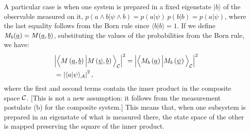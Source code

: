 \documentclass[aps,prl,amsmath,amssymb,twocolumn,nofootinbib]{revtex4}
\theoremstyle{plain}
\theoremstyle{definition}
\theoremstyle{remark}
\newcommand{\pj}[1] {\underbar{$#1$}}
\def\>{\rangle}
\def\<{\langle}
\def\labell#1{\label{#1}}
\begin{document}
	A particular case is when one system is
	prepared in a fixed eigenstate $|b\>$ of the observable measured on it,
	$p(a\wedge b|\psi\wedge b)=p(a|\psi)\:p(b|b)=p(a|\psi)$, where the last equality follows from the Born rule since $\<b|b\>=1$. 
	If we define $M_b(\pj{a}) = M(\pj{a},\pj{b})$, substituting the values of the
	probabilities from the Born rule, we have:
	\begin{align} &\Big|\Big\<M\left(\pj{a},\pj{b}\right)\Big|M\left(\pj{\psi},\pj{b}\right)\Big\>_{\cal C}\Big|^2
	=\Big|\Big\<M_b\left(\pj{a}\right)\Big|M_b\left(\pj{\psi}\right)\Big\>_{\cal C}\Big|^2
	\nonumber \\&
	=\left|\<a|\psi\>_{\cal A}\right|^2
	\labell{questa},
	\end{align}
	where the first and second terms contain the inner product in the composite
	space $\cal C$. [This is not a new assumption: it follows from the
	measurement postulate (b) for the composite system.] This means that,
	when one subsystem is prepared in an eigenstate of what is measured
	there, the state space of the other is mapped preserving the square of
	the inner product.
	
\end{document}
